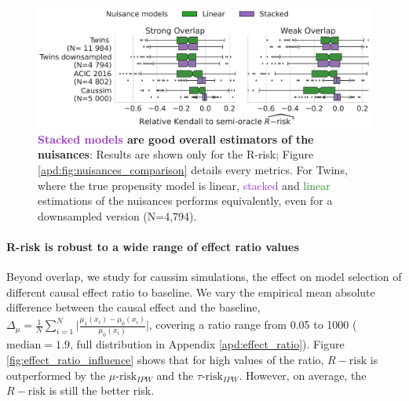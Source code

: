 \documentclass[a4paper,num-refs]{oup-contemporary}%
\begin{document}
\begin{figure}[!tb]
    \centering\begin{minipage}{\linewidth}
        \includegraphics[width=\linewidth]{_4_nuisance_models_r_risk_3ds_2cols.pdf}
    \end{minipage}

    \caption{\textbf{\textcolor{DarkOrchid}{Stacked
                models} are good overall estimators of the nuisances}:
        Results are shown only for the
        R-risk; Figure \ref{apd:fig:nuisances_comparison}
        details every metrics. For Twins, where the true propensity
        model is linear, \textcolor{DarkOrchid}{stacked} and
        \textcolor{ForestGreen}{linear}
        estimations of the nuisances performs equivalently, even for a downsampled version
        (N=4,794). }\label{fig:all_datasets_nuisances_comparison}
\end{figure}


\paragraph{R-risk is robust to a wide range of effect ratio values}

Beyond overlap, we study for caussim simulations, the effect on model selection
of different causal effect ratio to baseline. We vary the empirical mean
absolute difference between the causal effect and the baseline, $\Delta_{\mu} =
    \frac{1}{N} \sum_{i=1}^N \big | \frac{\mu_{1}(x_i) - \mu_{0}(x_i)}{\mu_{0}(x_i)}
    \big|$, covering a ratio range from 0.05 to 1000 ($\text{median}=1.9$, full
distribution in Appendix \ref{apd:effect_ratio}). Figure
\ref{fig:effect_ratio_influence} shows that for high values of the ratio,
$R-\text{risk}$ is outperformed by the $\mu\text{-risk}_{IPW}$ and the
$\tau\text{-risk}_{IPW}$. However, on average, the $R-\text{risk}$ is still the
better risk.
\end{document}
